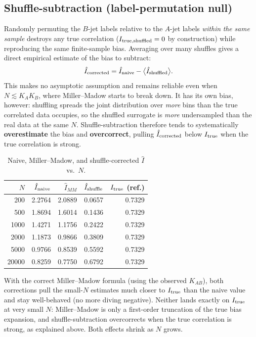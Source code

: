 \documentclass[11pt]{article}
\newcommand{\Itrue}{I_{\rm true}}
\begin{document}
\subsection{Shuffle-subtraction (label-permutation null)}

Randomly permuting the $B$-jet labels relative to the $A$-jet labels
\emph{within the same sample} destroys any true correlation
($I_{\rm true,shuffled}=0$ by construction) while reproducing the same
finite-sample bias. Averaging over many shuffles gives a direct empirical
estimate of the bias to subtract:
\begin{equation}
\hat I_{\rm corrected} = \hat I_{\rm naive} -
\big\langle \hat I_{\rm shuffled}\big\rangle .
\end{equation}
This makes no asymptotic assumption and remains reliable even when
$N\lesssim K_AK_B$, where Miller--Madow starts to break down. It has its
own bias, however: shuffling spreads the joint distribution over
\emph{more} bins than the true correlated data occupies, so the shuffled
surrogate is \emph{more} undersampled than the real data at the same $N$.
Shuffle-subtraction therefore tends to systematically
\textbf{overestimate} the bias and \textbf{overcorrect}, pulling
$\hat I_{\rm corrected}$ below $\Itrue$ when the true correlation is
strong.

\begin{table}[h]
\centering
\caption{Naive, Miller--Madow, and shuffle-corrected $\hat I$ vs.\ $N$.}
\label{tab:corrections}
\begin{tabular}{rrrrr}
\toprule
$N$ & $\hat I_{\rm naive}$ & $\hat I_{MM}$ & $\hat I_{\rm shuffle}$ & $\Itrue$ (ref.) \\
\midrule
200    & 2.2764 & 2.0889 & 0.0657 & 0.7329 \\
500    & 1.8694 & 1.6014 & 0.1436 & 0.7329 \\
1000   & 1.4271 & 1.1756 & 0.2422 & 0.7329 \\
2000   & 1.1873 & 0.9866 & 0.3809 & 0.7329 \\
5000   & 0.9766 & 0.8539 & 0.5592 & 0.7329 \\
20000  & 0.8259 & 0.7750 & 0.6792 & 0.7329 \\
\bottomrule
\end{tabular}
\end{table}

With the correct Miller--Madow formula (using the observed $K_{AB}$), both
corrections pull the small-$N$ estimates much closer to $\Itrue$ than the
naive value and stay well-behaved (no more diving negative). Neither lands
exactly on $\Itrue$ at very small $N$: Miller--Madow is only a
first-order truncation of the true bias expansion, and shuffle-subtraction
overcorrects when the true correlation is strong, as explained above. Both
effects shrink as $N$ grows.
\end{document}
